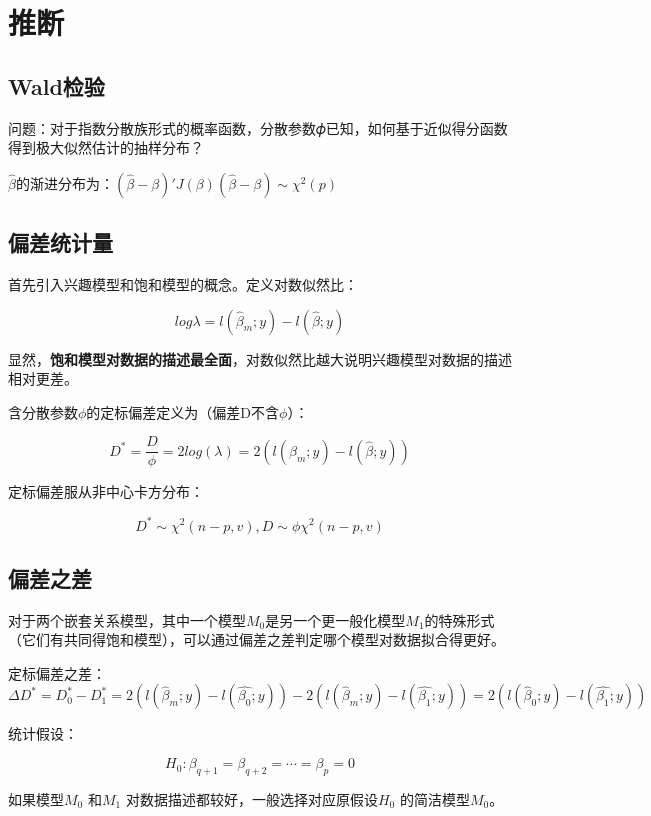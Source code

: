 \documentclass[
]{book}
\begin{document}
\section{推断}\label{ux63a8ux65ad}

\subsection{Wald检验}\label{waldux68c0ux9a8c}

问题：对于指数分散族形式的概率函数，分散参数𝜙已知，如何基于近似得分函数得到极大似然估计的抽样分布？

\(\hat{\beta}\)的渐进分布为：\((\hat{\beta}-\beta)'J(\beta)(\hat{\beta}-\beta)\sim \chi^2(p)\)

\subsection{偏差统计量}\label{ux504fux5deeux7edfux8ba1ux91cf}

首先引入兴趣模型和饱和模型的概念。定义对数似然比：

\[
log\lambda = l(\hat{\beta}_m;y)-l(\hat{\beta};y)
\]

显然，\textbf{饱和模型对数据的描述最全面}，对数似然比越大说明兴趣模型对数据的描述相对更差。

含分散参数\(\phi\)的定标偏差定义为（偏差D不含\(\phi\)）：

\[
D^*=\frac{D}{\phi}=2log(\lambda) = 2(l(\hat{\beta}_m;y)-l(\hat{\beta};y))
\]

定标偏差服从非中心卡方分布：

\[
D^*\sim \chi^2(n-p,v),D\sim \phi \chi^2(n-p,v)
\]

\subsection{偏差之差}\label{ux504fux5deeux4e4bux5dee}

对于两个嵌套关系模型，其中一个模型\(M_0\)是另一个更一般化模型\(M_1\)的特殊形式（它们有共同得饱和模型），可以通过偏差之差判定哪个模型对数据拟合得更好。

定标偏差之差： \[
\Delta D^*=D_0^*-D_1^*=2(l(\hat{\beta}_m;y)-l(\hat{\beta_0};y))-2(l(\hat{\beta}_m;y)-l(\hat{\beta_1};y))=2(l(\hat{\beta}_0;y)-l(\hat{\beta_1};y))
\]

统计假设：

\[
H_0:\beta_{q+1}=\beta_{q+2}=\cdots=\beta_p=0
\]

如果模型\(M_0\) 和\(M_1\) 对数据描述都较好，一般选择对应原假设\(H_0\) 的简洁模型\(M_0\)。
\end{document}
